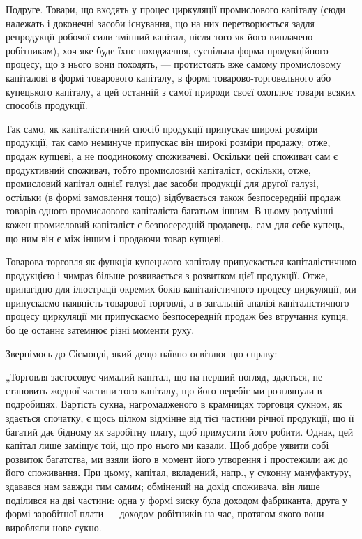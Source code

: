 Подруге. Товари, що входять у процес циркуляції промислового
капіталу (сюди належать і доконечні засоби існування, що на них перетворюється
задля репродукції робочої сили змінний капітал, після того як
його виплачено робітникам), хоч яке буде їхнє походження, суспільна
форма продукційного процесу, що з нього вони походять, — протистоять
вже самому промисловому капіталові в формі товарового капіталу, в формі
товарово-торговельного або купецького капіталу, а цей останній з самої
природи своєї охоплює товари всяких способів продукції.

Так само, як капіталістичний спосіб продукції припускає широкі розміри
продукції, так само неминуче припускає він широкі розміри продажу;
отже, продаж купцеві, а не поодинокому споживачеві. Оскільки цей
споживач сам є продуктивний споживач, тобто промисловий капіталіст,
оскільки, отже, промисловий капітал однієї галузі дає засоби продукції
для другої галузі, остільки (в формі замовлення тощо) відбувається
також безпосередній продаж товарів одного промислового капіталіста
багатьом іншим. В цьому розумінні кожен промисловий капіталіст є безпосередній
продавець, сам для себе купець, що ним він є між іншим і
продаючи товар купцеві.

Товарова торговля як функція купецького капіталу припускається
капіталістичною продукцією і чимраз більше розвивається з розвитком
цієї продукції. Отже, принагідно для ілюстрації окремих боків капіталістичного
процесу циркуляції, ми припускаємо наявність товарової торговлі,
а в загальній аналізі капіталістичного процесу циркуляції ми
припускаємо безпосередній продаж без втручання купця, бо це останнє
затемнює різні моменти руху.

Звернімось до Сісмонді, який дещо наївно освітлює цю справу:

„Торговля застосовує чималий капітал, що на перший погляд,
здається, не становить жодної частини того капіталу, що його перебіг
ми розглянули в подробицях. Вартість сукна, нагромадженого в крамницях
торговця сукном, як здається спочатку, є щось цілком відмінне
від тієї частини річної продукції, що її багатий дає бідному як заробітну
плату, щоб примусити його робити. Однак, цей капітал лише заміщує
той, що про нього ми казали. Щоб добре уявити собі розвиток багатства,
ми взяли його в момент його утворення і простежили аж до його
споживання. При цьому, капітал, вкладений, напр., у суконну мануфактуру,
здавався нам завжди тим самим; обмінений на дохід споживача, він
лише поділився на дві частини: одна у формі зиску була доходом фабриканта,
друга у формі заробітної плати — доходом робітників на час,
протягом якого вони виробляли нове сукно.

